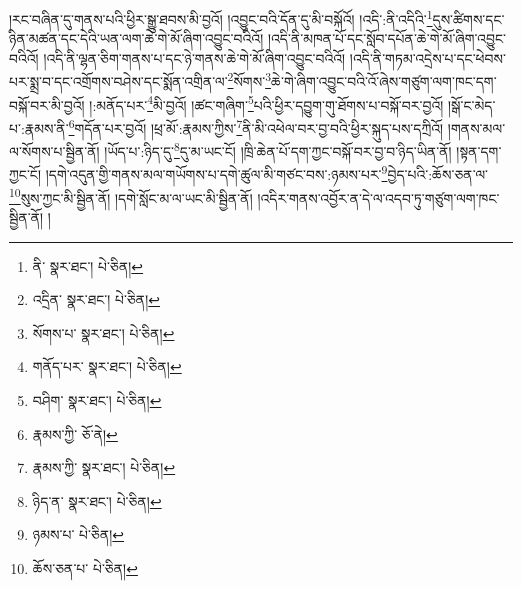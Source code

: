 །རང་བཞིན་དུ་གནས་པའི་ཕྱིར་སྒྱུ་ཐབས་མི་བྱའོ། །འབྱུང་བའི་དོན་དུ་མི་བསྐོའོ། །འདི་:ནི་འདིའི་\footnote{ནི་  སྣར་ཐང་།  པེ་ཅིན། }དུས་ཚིགས་དང་ཉིན་མཚན་དང་དེའི་ཡན་ལག་ཆེ་གེ་མོ་ཞིག་འབྱུང་བའིའོ། །འདི་ནི་མཁན་པོ་དང་སློབ་དཔོན་ཆེ་གེ་མོ་ཞིག་འབྱུང་བའིའོ། །འདི་ནི་ལྷན་ཅིག་གནས་པ་དང་ཉེ་གནས་ཆེ་གེ་མོ་ཞིག་འབྱུང་བའིའོ། །འདི་ནི་གཏམ་འདྲེས་པ་དང་ཕེབས་པར་སྨྲ་བ་དང་འགྲོགས་བཤེས་དང་སྨོན་འགྲིན་ལ་\footnote{འདྲིན་  སྣར་ཐང་།  པེ་ཅིན། }སོགས་\footnote{སོགས་པ་  སྣར་ཐང་།  པེ་ཅིན། }ཆེ་གེ་ཞིག་འབྱུང་བའི་འོ་ཞེས་གཙུག་ལག་ཁང་དག་བསྐོ་བར་མི་བྱའོ། །:མནོད་པར་\footnote{གནོད་པར་  སྣར་ཐང་།  པེ་ཅིན། }མི་བྱའོ། །ཚང་གཞིག་\footnote{བཤིག་  སྣར་ཐང་།  པེ་ཅིན། }པའི་ཕྱིར་དབྱུག་གུ་ཐོགས་པ་བསྐོ་བར་བྱའོ། །སྒོ་ང་མེད་པ་:རྣམས་ནི་\footnote{རྣམས་ཀྱི་  ཅོ་ནེ། }གདོན་པར་བྱའོ། །ཕྲ་མོ་:རྣམས་ཀྱིས་\footnote{རྣམས་ཀྱི་  སྣར་ཐང་།  པེ་ཅིན། }ནི་མི་འཕེལ་བར་བྱ་བའི་ཕྱིར་སྐུད་པས་དཀྲིའོ། །གནས་མལ་ལ་སོགས་པ་སྦྱིན་ནོ། །ཡོད་པ་:ཉིད་དུ་\footnote{ཉིད་ན་  སྣར་ཐང་།  པེ་ཅིན། }དུ་མ་ཡང་ངོ། །ཁྲི་ཆེན་པོ་དག་ཀྱང་བསྐོ་བར་བྱ་བ་ཉིད་ཡིན་ནོ། །སྟན་དག་ཀྱང་ངོ། །དགེ་འདུན་གྱི་གནས་མལ་གཡོགས་པ་དགེ་ཚུལ་མི་གཙང་བས་:ཉམས་པར་\footnote{ཉམས་པ་  པེ་ཅིན། }བྱེད་པའི་:ཆོས་ཅན་ལ་\footnote{ཆོས་ཅན་པ་  པེ་ཅིན། }སུས་ཀྱང་མི་སྦྱིན་ནོ། །དགེ་སློང་མ་ལ་ཡང་མི་སྦྱིན་ནོ། །འདིར་གནས་འབྱོར་ན་དེ་ལ་འདབ་ཏུ་གཙུག་ལག་ཁང་སྦྱིན་ནོ། །
